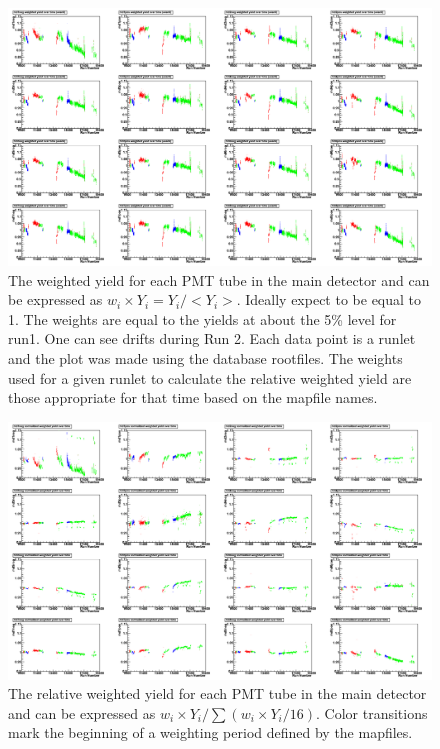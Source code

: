 \begin{singlespace}
\begin{figure}[!h]
	\begin{center}
	\includegraphics[width=15.0cm]{figures/qweakPVweightedYield}
	\end{center}
	\caption
	{The weighted yield for each PMT tube in the main detector and can be expressed as $w_{i} \times Y_{i} = Y_{i}/<Y_{i}>$. Ideally expect to be equal to 1. The weights are equal to the yields at about the 5\% level for run1. One can see drifts during Run 2. Each data point is a runlet and the plot was made using the database rootfiles. The weights used for a given runlet to calculate the relative weighted yield are those appropriate for that time based on the mapfile names.}
	\label{fig:qweakPVweightedYield}
\end{figure}
\end{singlespace}

\begin{singlespace}
\begin{figure}[!h]
	\begin{center}
	\includegraphics[width=15.0cm]{figures/qweakPVrelWeightedYield}
	\end{center}
	\caption
	{The relative weighted yield for each PMT tube in the main detector and can be expressed as $w_{i} \times Y_{i}/ \sum(w_{i} \times Y_{i}/16)$. Color transitions mark the beginning of a weighting period defined by the mapfiles.}
	\label{fig:qweakPVrelWeightedYield}
\end{figure}
\end{singlespace}
